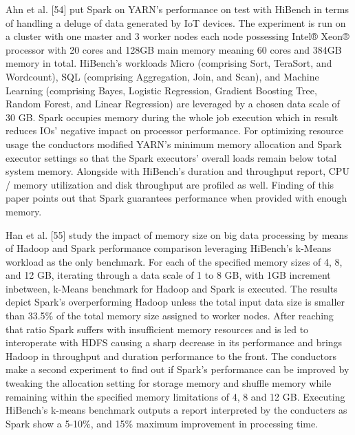 \documentclass[review]{elsarticle}
\begin{document}
Ahn et al. [54] put Spark on YARN’s performance on test with HiBench in terms of handling a deluge of data generated by IoT devices. The experiment is run on a cluster with one master and 3 worker nodes each node possessing Intel® Xeon® processor with 20 cores and 128GB main memory meaning 60 cores and 384GB memory in total. HiBench’s workloads Micro (comprising Sort, TeraSort, and Wordcount), SQL (comprising Aggregation, Join, and Scan), and Machine Learning (comprising Bayes, Logistic Regression, Gradient Boosting Tree, Random Forest, and Linear Regression) are leveraged by a chosen data scale of 30 GB. Spark occupies memory during the whole job execution which in result reduces IOs’ negative impact on processor performance. For optimizing resource usage the conductors modified YARN’s minimum memory allocation and Spark executor settings so that the Spark executors’ overall loads remain below total system memory. Alongside with HiBench’s duration and throughput report, CPU / memory utilization and disk throughput are profiled as well. Finding of this paper points out that Spark guarantees performance when provided with enough memory.

Han et al. [55] study the impact of memory size on big data processing by means of Hadoop and Spark performance comparison leveraging HiBench’s k-Means workload as the only benchmark. For each of the specified memory sizes of 4, 8, and 12 GB, iterating through a data scale of 1 to 8 GB, with 1GB increment inbetween, k-Means benchmark for Hadoop and Spark is executed. The results depict Spark’s overperforming Hadoop unless the total input data size is smaller than 33.5\% of the total memory size assigned to worker nodes. After reaching that ratio Spark suffers with insufficient memory resources and is led to interoperate with HDFS causing a sharp decrease in its performance and brings Hadoop in throughput and duration performance to the front. The conductors make a second experiment to find out if Spark’s performance can be improved by tweaking the allocation setting for storage memory and shuffle memory while remaining within the specified memory limitations of 4, 8 and 12 GB. Executing HiBench’s k-means benchmark outputs a report interpreted by the conducters as Spark show a 5-10\%, and 15\% maximum improvement in processing time.
\end{document}
